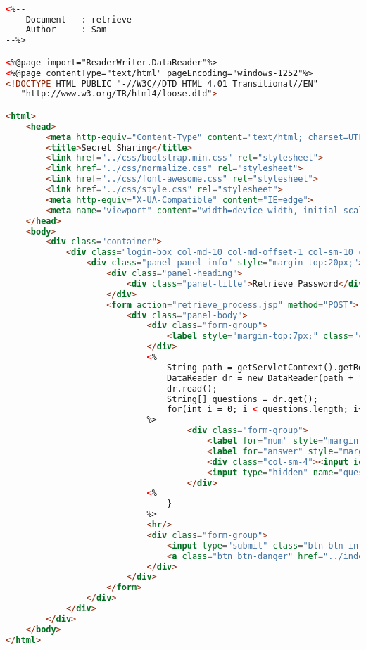 \begin{lstlisting}[language=html,basicstyle=\tiny,caption=retrieve.jsp]

<%--
    Document   : retrieve
    Author     : Sam
--%>

<%@page import="ReaderWriter.DataReader"%>
<%@page contentType="text/html" pageEncoding="windows-1252"%>
<!DOCTYPE HTML PUBLIC "-//W3C//DTD HTML 4.01 Transitional//EN"
   "http://www.w3.org/TR/html4/loose.dtd">

<html>
    <head>
        <meta http-equiv="Content-Type" content="text/html; charset=UTF-8">
        <title>Secret Sharing</title>
        <link href="../css/bootstrap.min.css" rel="stylesheet">
        <link href="../css/normalize.css" rel="stylesheet">
        <link href="../css/font-awesome.css" rel="stylesheet">
        <link href="../css/style.css" rel="stylesheet">
        <meta http-equiv="X-UA-Compatible" content="IE=edge">
        <meta name="viewport" content="width=device-width, initial-scale=1">
    </head>
    <body>
        <div class="container">
            <div class="login-box col-md-10 col-md-offset-1 col-sm-10 col-sm-offset-1">
                <div class="panel panel-info" style="margin-top:20px;">
                    <div class="panel-heading">
                        <div class="panel-title">Retrieve Password</div>
                    </div>
                    <form action="retrieve_process.jsp" method="POST">
                        <div class="panel-body">
                            <div class="form-group">
                                <label style="margin-top:7px;" class="col-sm-7 control-label">Security Questions</label>
                            </div>
                            <%
                                String path = getServletContext().getRealPath("data");
                                DataReader dr = new DataReader(path + "\\data_questions.txt");
                                dr.read();
                                String[] questions = dr.get();
                                for(int i = 0; i < questions.length; i++) {
                            %>
                                    <div class="form-group">
                                        <label for="num" style="margin-top:7px;" class="col-sm-1 control-label"><%= (i+1) + "." %></label>
                                        <label for="answer" style="margin-top:7px;" class="col-sm-7 control-label"><%= questions[i] %></label>
                                        <div class="col-sm-4"><input id="ans" name="answer" type="text" class="form-control"/></div>
                                        <input type="hidden" name="questions" value="<%= questions[i] %>"/>
                                    </div>
                            <%
                                }
                            %>
                            <hr/>
                            <div class="form-group">
                                <input type="submit" class="btn btn-info" value="Submit"/>
                                <a class="btn btn-danger" href="../index.jsp">Cancel</a>
                            </div>
                        </div>
                    </form>
                </div>
            </div>
        </div>
    </body>
</html>


\end{lstlisting}

